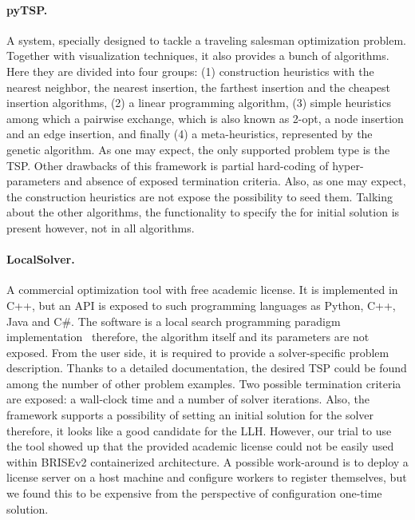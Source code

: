 \paragraph{pyTSP.} A system, specially designed to tackle a traveling salesman optimization problem. Together with visualization techniques, it also provides a bunch of algorithms. Here they are divided into four groups: (1) construction heuristics with the nearest neighbor, the nearest insertion, the farthest insertion and the cheapest insertion algorithms, (2) a linear programming algorithm, (3) simple heuristics among which a pairwise exchange, which is also known as 2-opt, a node insertion and an edge insertion, and finally (4) a meta-heuristics, represented by the genetic algorithm. As one may expect, the only supported problem type is the TSP. Other drawbacks of this framework is partial hard-coding of hyper-parameters and absence of exposed termination criteria. Also, as one may expect, the construction heuristics are not expose the possibility to seed them. Talking about the other algorithms, the functionality to specify the for initial solution is present however, not in all algorithms.

\paragraph{LocalSolver.} A commercial optimization tool with free academic license. It is implemented in C++, but an API is exposed to such programming languages as Python, C++, Java and C\#. The software is a local search programming paradigm implementation~\cite{benoist2010toward,benoist2011localsolver} therefore, the algorithm itself and its parameters are not exposed. From the user side, it is required to provide a solver-specific problem description. Thanks to a detailed documentation, the desired TSP could be found among the number of other problem examples. Two possible termination criteria are exposed: a wall-clock time and a number of solver iterations. Also, the framework supports a possibility of setting an initial solution for the solver therefore, it looks like a good candidate for the LLH. However, our trial to use the tool showed up that the provided academic license could not be easily used within BRISEv2 containerized architecture. A possible work-around is to deploy a license server on a host machine and configure workers to register themselves, but we found this to be expensive from the perspective of configuration one-time solution.

